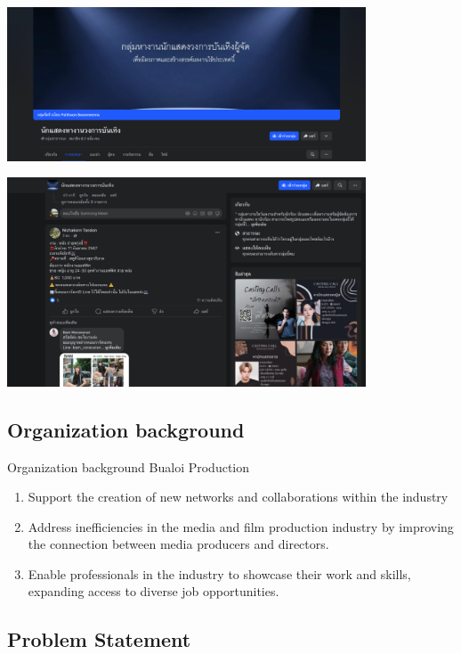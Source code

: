 \documentclass[aspectratio=169]{beamer}
\begin{document}
\begin{frame}
    \centering
    \includegraphics[width=0.8\textwidth]{example0.png}
\end{frame}

\begin{frame}
    \centering
    \includegraphics[width=0.8\textwidth]{example1.png}
\end{frame}

\subsection{Organization background}

\begin{frame}{Organization background}
    Bualoi Production
    \begin{enumerate}
        \item Support the creation of new networks and collaborations within the industry
        \item Address inefficiencies in the media and film production industry by improving the connection between media producers and directors.
        \item Enable professionals in the industry to showcase their work and skills, expanding access to diverse job opportunities.
    \end{enumerate}
\end{frame}

\subsection{Problem Statement}
\end{document}
